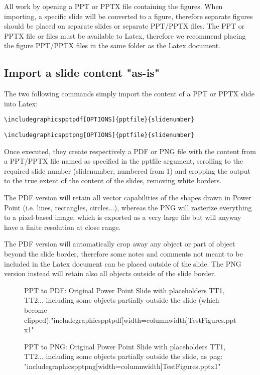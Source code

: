 \documentclass[10pt,,a4paper]{article}
\begin{document}
All work by opening a PPT or PPTX file containing the figures. 
When importing, a specific slide will be converted to a figure, therefore separate figures should be placed on separate slides or separate PPT/PPTX files.
The PPT or PPTX file or files must be available to Latex, therefore we recommend placing the figure PPT/PPTX files in the same folder as the Latex document.


\subsection{Import a slide content "as-is"}
The two following commands simply import the content of a PPT or PPTX slide into Latex:
\begin{verbatim}
\includegraphicspptpdf[OPTIONS]{pptfile}{slidenumber}
\end{verbatim}
\begin{verbatim}
\includegraphicspptpng[OPTIONS]{pptfile}{slidenumber}
\end{verbatim}

Once executed, they create respectively a PDF or PNG file with the content from a PPT/PPTX file named as specified in the pptfile argument, scrolling to the required slide number (slidenumber, numbered from 1) and cropping the output to the true extent of the content of the slides, removing white borders.

The PDF version will retain all vector capabilities of the shapes drawn in Power Point (i.e. lines, rectangles, circles...), whereas the PNG will rasterize everything to a pixel-based image, which is exported as a very large file but will anyway have a finite resolution at close range.

The PDF version will automatically crop away any object or part of object beyond the slide border, therefore some notes and comments not meant to be included in the Latex document can be placed outside of the slide.
The PNG version instead will retain also all objects outside of the slide border.


\begin{figure}%
%
\caption{PPT to PDF: Original Power Point Slide with placeholders TT1, TT2... including some objects partially outside the slide (which become clipped):"includegraphicspptpdf[width=columnwidth]{TestFigures.pptx}{1}"}%
\label{}%
\end{figure}

\begin{figure}%
%
\caption{PPT to PNG: Original Power Point Slide with placeholders TT1, TT2... including some objects partially outside the slide, as png: "includegraphicspptpng[width=columnwidth]{TestFigures.pptx}{1}"}%
\label{}%
\end{figure}
\end{document}
